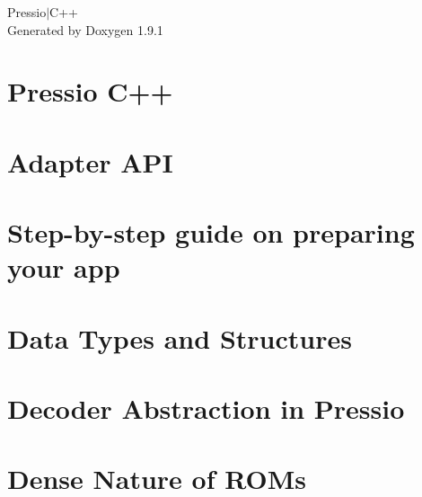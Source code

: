 \let\mypdfximage\pdfximage\def\pdfximage{\immediate\mypdfximage}\documentclass[twoside]{book}
\newcommand{\+}{\discretionary{\mbox{\scriptsize$\hookleftarrow$}}{}{}}
\newcommand{\clearemptydoublepage}{%
  \newpage{\pagestyle{empty}\cleardoublepage}%
}
\begin{document}
\raggedbottom

\hypersetup{pageanchor=false,
             bookmarksnumbered=true,
             pdfencoding=unicode
            }
\begin{titlepage}
\vspace*{7cm}
\begin{center}%
{\Large Pressio$\vert$\+C++ }\\
\vspace*{1cm}
{\large Generated by Doxygen 1.9.1}\\
\end{center}
\end{titlepage}
\clearemptydoublepage
{}
\tableofcontents
\clearemptydoublepage
{}
\hypersetup{pageanchor=true}

\chapter{Pressio C++}
\label{index}\hypertarget{index}{}
\chapter{Adapter API}
\label{md_pages_coreconcepts_adapter_api}

\chapter{Step-\/by-\/step guide on preparing your app}
\label{md_pages_coreconcepts_adapting_app}

\chapter{Data Types and Structures}
\label{md_pages_coreconcepts_datatypes}

\chapter{Decoder Abstraction in Pressio}
\label{md_pages_coreconcepts_decoder}

\chapter{Dense Nature of ROMs}
\label{md_pages_coreconcepts_densenature}

\end{document}
